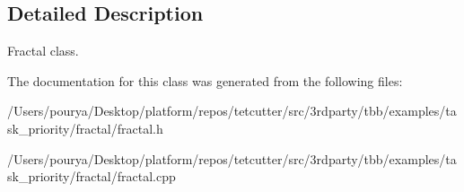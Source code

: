 \subsection{Detailed Description}
Fractal class. 

The documentation for this class was generated from the following files\+:\begin{DoxyCompactItemize}
\item 
/\+Users/pourya/\+Desktop/platform/repos/tetcutter/src/3rdparty/tbb/examples/task\+\_\+priority/fractal/fractal.\+h\item 
/\+Users/pourya/\+Desktop/platform/repos/tetcutter/src/3rdparty/tbb/examples/task\+\_\+priority/fractal/fractal.\+cpp\end{DoxyCompactItemize}
